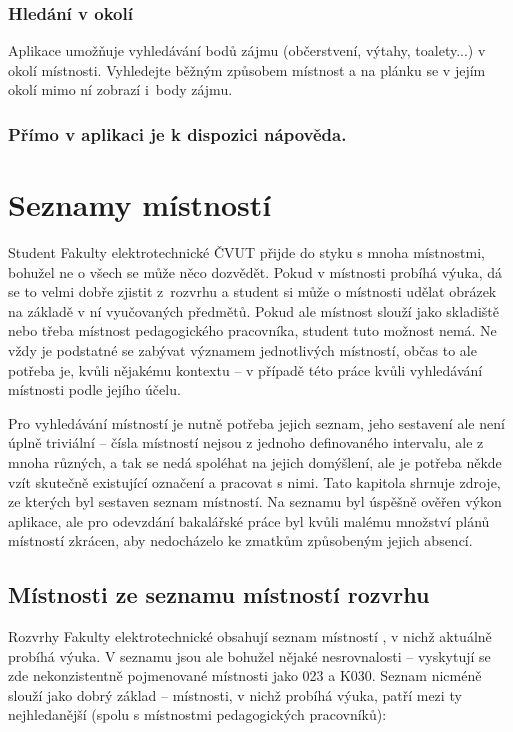 \subsection{Hledání v okolí}
Aplikace umožňuje vyhledávání bodů zájmu (občerstvení, výtahy, toalety...) v okolí místnosti. Vyhledejte běžným způsobem místnost a na plánku se v jejím okolí mimo ní zobrazí i~body zájmu.

\subsection*{Přímo v aplikaci je k dispozici nápověda.}



\chapter{Seznamy místností}
Student Fakulty elektrotechnické ČVUT přijde do styku s mnoha místnostmi, bohužel ne o všech se může něco dozvědět. Pokud v místnosti probíhá výuka, dá se to velmi dobře zjistit z~rozvrhu a student si může o místnosti udělat obrázek na základě v ní vyučovaných předmětů. Pokud ale místnost slouží jako skladiště nebo třeba místnost pedagogického pracovníka, student tuto možnost nemá. Ne vždy je podstatné se zabývat významem jednotlivých místností, občas to ale potřeba je, kvůli nějakému kontextu -- v případě této práce kvůli vyhledávání místnosti podle jejího účelu.

Pro vyhledávání místností je nutně potřeba jejich seznam, jeho sestavení ale není úplně triviální -- čísla místností nejsou z jednoho definovaného intervalu, ale z mnoha různých, a tak se nedá spoléhat na jejich domýšlení, ale je potřeba někde vzít skutečně existující označení a pracovat s nimi. Tato kapitola shrnuje zdroje, ze kterých byl sestaven seznam místností. Na seznamu byl úspěšně ověřen výkon aplikace, ale pro odevzdání bakalářské práce byl kvůli malému množství plánů místností zkrácen, aby nedocházelo ke zmatkům způsobeným jejich absencí.

\section{Místnosti ze seznamu místností rozvrhu}
Rozvrhy Fakulty elektrotechnické obsahují seznam místností \cite{FelMistnosti}, v nichž aktuálně probíhá výuka. V seznamu jsou ale bohužel nějaké nesrovnalosti -- vyskytují se zde nekonzistentně pojmenované místnosti jako 023 a K030. Seznam nicméně slouží jako dobrý základ -- místnosti, v nichž probíhá výuka, patří mezi ty nejhledanější (spolu s místnostmi pedagogických pracovníků):

